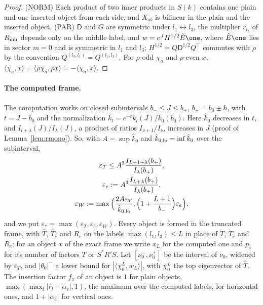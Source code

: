 \begin{proof}
(NORM) Each product of two inner products in $S(k)$ contains one plain and one inserted object from each side, and $X_{ab}$ is bilinear in the plain and
the inserted object. (PAR) $\mathsf D$ and $G$ are symmetric under $l_1\leftrightarrow l_3$, the multiplier $r_{l_2}$ of $R_{\rm mh}$ depends only on the middle
label, and $w=e^JH^{1/2}\tilde E\one$, where $\tilde E\one$ lies in sector $m=0$ and is symmetric in $l_1$ and $l_3$; $H^{1/2}=Q\mathsf D^{1/2}Q^\top$ commutes
with $\rho$ by the convention $Q^{(l_3,l_1)}=Q^{(l_1,l_3)}$. For $\rho$-odd $\chi_a$ and $\rho$-even $x$, $\langle\chi_a,x\rangle=\langle\rho\chi_a,\rho x\rangle=
-\langle\chi_a,x\rangle$.
\end{proof}

\paragraph{The computed frame.}
The computation works on closed subintervals $b_-\le J\le b_+$, $b_\pm=b_0\pm h$, with $t=J-b_0$ and the normalization $\hat k_l=e^{-t}k_l(J)/k_0(b_0)$.
Here $\hat k_0$ decreases in $t$, and $I_{l+\lambda}(J)/I_\lambda(J)$, a product of ratios $I_{\nu+1}/I_\nu$, increases in $J$ (proof of
Lemma~\ref{lem:rmono}). So, with $A=\sup\hat k_0$ and $\hat k_{0,\rm lo}=\inf\hat k_0$ over the subinterval,
\begin{gather*}
\varepsilon_T\le A^3\frac{I_{L+1+\lambda}(b_+)}{I_\lambda(b_+)},\\
\varepsilon_e:=A^3\frac{I_{L+\lambda}(b_+)}{I_\lambda(b_+)},\\
\varepsilon_W:=\max\Big(\frac{2A\varepsilon_T}{\hat k_{0,\rm lo}},\Big(1+\frac{L+1}{b_-}\Big)\varepsilon_e\Big),
\end{gather*}
and we put $\varepsilon_*=\max(\varepsilon_T,\varepsilon_e,\varepsilon_W)$. Every object is formed in the truncated frame, with $\hat T$, $\hat T_e$ and $R_e$ on
the labels $\max(l_1,l_3)\le L$ in place of $\tilde T$, $\tilde T_e$ and $R_e$; for an object $x$ of the exact frame we write $x_L$ for the computed one and
$p_x$ for its number of factors $T$ or $S^*R'S$. Let $[\nu_0^-,\nu_0^+]$ be the interval of $\nu_0$, widened by $\varepsilon_T$, and $|\theta_0|^-$ a lower
bound for $|\langle\chi_0^L,w_L\rangle|$, with $\chi_0^L$ the top eigenvector of $\hat T$. The insertion factor $f_x$ of an object is $1$ for plain objects,
$\max(\max_l|r_l-\alpha_e|,1)$, the maximum over the
computed labels, for horizontal ones, and $1+|\alpha_e|$ for vertical ones.

